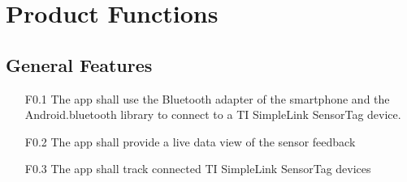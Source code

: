 \section{Product Functions}


\subsection{General Features}
\begin{itemize}
  \item[F0.1] The app shall use the Bluetooth adapter of the smartphone and the Android.bluetooth library to connect to a TI SimpleLink SensorTag device.
  \item[F0.2] The app shall provide a live data view of the sensor feedback
  \item[F0.3] The app shall track connected TI SimpleLink SensorTag devices
\end{itemize}

